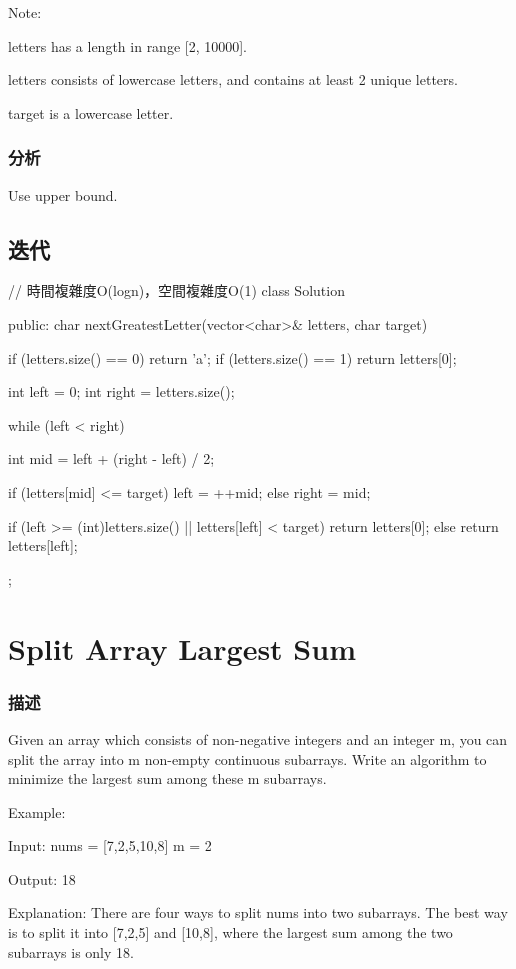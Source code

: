 Note:
\begindot
\item letters has a length in range [2, 10000].
\item letters consists of lowercase letters, and contains at least 2 unique letters.
\item target is a lowercase letter.
\myenddot


\subsubsection{分析}
Use upper bound.


\subsection{迭代}
\begin{Code}
// 時間複雜度O(logn)，空間複雜度O(1)
class Solution {
public:
    char nextGreatestLetter(vector<char>& letters, char target) {
        if (letters.size() == 0) return 'a';
        if (letters.size() == 1) return letters[0];

        int left = 0;
        int right = letters.size();

        while (left < right) {
            int mid = left + (right - left) / 2;

            if (letters[mid] <= target)
                left = ++mid;
            else
                right = mid;
        }

        if (left >= (int)letters.size() || letters[left] < target)
            return letters[0];
        else
            return letters[left];
    }
};
\end{Code}

\section{Split Array Largest Sum} %
\label{sec:split-array-largest-sum}


\subsubsection{描述}
Given an array which consists of non-negative integers and an integer m, you can split the array into m non-empty continuous subarrays. Write an algorithm to minimize the largest sum among these m subarrays.

Example:
\begin{Code}
Input:
nums = [7,2,5,10,8]
m = 2

Output:
18

Explanation:
There are four ways to split nums into two subarrays.
The best way is to split it into [7,2,5] and [10,8],
where the largest sum among the two subarrays is only 18.
\end{Code}

